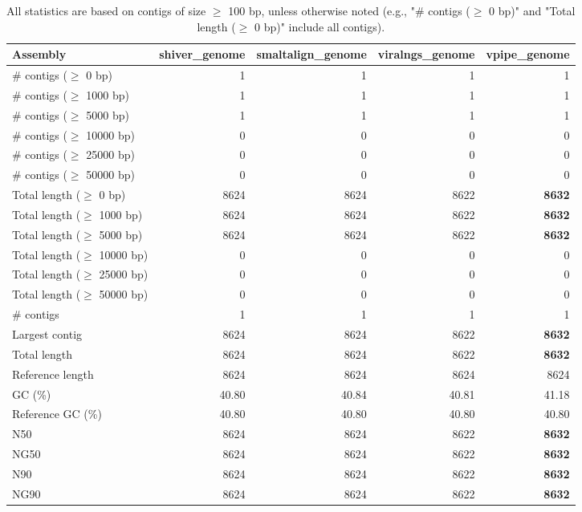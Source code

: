 \documentclass[12pt,a4paper]{article}
\begin{document}
\begin{table}[ht]
\begin{center}
\caption{All statistics are based on contigs of size $\geq$ 100 bp, unless otherwise noted (e.g., "\# contigs ($\geq$ 0 bp)" and "Total length ($\geq$ 0 bp)" include all contigs).}
\begin{tabular}{|l*{4}{|r}|}
\hline
Assembly & shiver\_genome & smaltalign\_genome & viralngs\_genome & vpipe\_genome \\ \hline
\# contigs ($\geq$ 0 bp) & 1 & 1 & 1 & 1 \\ \hline
\# contigs ($\geq$ 1000 bp) & 1 & 1 & 1 & 1 \\ \hline
\# contigs ($\geq$ 5000 bp) & 1 & 1 & 1 & 1 \\ \hline
\# contigs ($\geq$ 10000 bp) & 0 & 0 & 0 & 0 \\ \hline
\# contigs ($\geq$ 25000 bp) & 0 & 0 & 0 & 0 \\ \hline
\# contigs ($\geq$ 50000 bp) & 0 & 0 & 0 & 0 \\ \hline
Total length ($\geq$ 0 bp) & 8624 & 8624 & 8622 & {\bf 8632} \\ \hline
Total length ($\geq$ 1000 bp) & 8624 & 8624 & 8622 & {\bf 8632} \\ \hline
Total length ($\geq$ 5000 bp) & 8624 & 8624 & 8622 & {\bf 8632} \\ \hline
Total length ($\geq$ 10000 bp) & 0 & 0 & 0 & 0 \\ \hline
Total length ($\geq$ 25000 bp) & 0 & 0 & 0 & 0 \\ \hline
Total length ($\geq$ 50000 bp) & 0 & 0 & 0 & 0 \\ \hline
\# contigs & 1 & 1 & 1 & 1 \\ \hline
Largest contig & 8624 & 8624 & 8622 & {\bf 8632} \\ \hline
Total length & 8624 & 8624 & 8622 & {\bf 8632} \\ \hline
Reference length & 8624 & 8624 & 8624 & 8624 \\ \hline
GC (\%) & 40.80 & 40.84 & 40.81 & 41.18 \\ \hline
Reference GC (\%) & 40.80 & 40.80 & 40.80 & 40.80 \\ \hline
N50 & 8624 & 8624 & 8622 & {\bf 8632} \\ \hline
NG50 & 8624 & 8624 & 8622 & {\bf 8632} \\ \hline
N90 & 8624 & 8624 & 8622 & {\bf 8632} \\ \hline
NG90 & 8624 & 8624 & 8622 & {\bf 8632} \\ \hline

\end{tabular}
\end{center}
\end{table}
\end{document}
